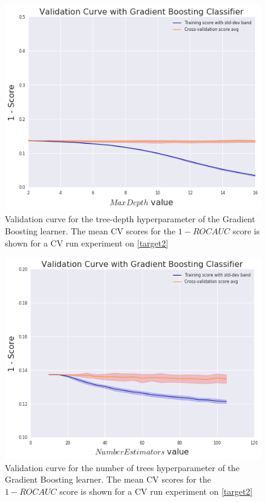 \begin{figure}[h!]
	\begin{center}
		\includegraphics[width=1\linewidth]{figures/gradient-boosting/validation_curve_boosting_depth_series_f1}
		\caption{ Validation curve for the tree-depth hyperparameter of the Gradient Boosting learner.
		The mean CV scores for the $1 - ROC AUC$ score is shown for a CV run experiment on \cref{target2}}
		\label{fig:boosting_validation_curves_depth_trees}

	\end{center}
\end{figure}

\begin{figure}[h!]
	\begin{center}
		\includegraphics[width=1\linewidth]{figures/gradient-boosting/validation_curve_boosting_num_trees_series_f1}
			\caption{ Validation curve for the number of trees hyperparameter of the Gradient Boosting learner. The mean CV scores for the $1 - ROC AUC$ score is shown for a CV run experiment on \cref{target2}}
			\label{fig:boosting_validation_curves_num_trees}
	\end{center}
\end{figure}


